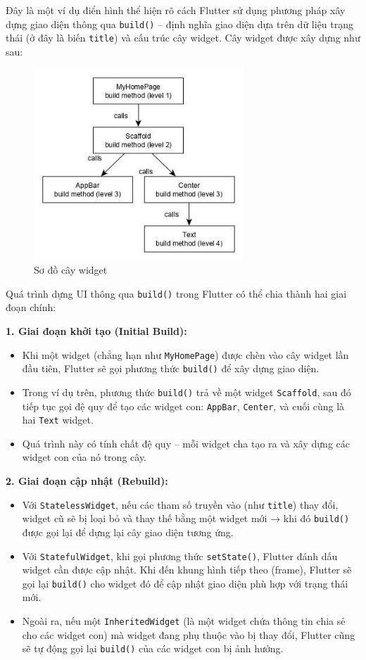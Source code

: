 \documentclass[../DoAn.tex]{subfiles}
\numberwithin{figure}{chapter}
\begin{document}
Đây là một ví dụ điển hình thể hiện rõ cách Flutter sử dụng phương pháp xây dựng giao diện thông qua \texttt{build()} – định nghĩa giao diện dựa trên dữ liệu trạng thái (ở đây là biến \texttt{title}) và cấu trúc cây widget. Cây widget được xây dựng như sau:
\begin{figure}[H]
    \centering
    \includegraphics[width=0.7\textwidth]{Hinhve/Chuong5/widgettree.png}
    \caption{Sơ đồ cây widget}
    \label{fig:widgettree}
\end{figure}
Quá trình dựng UI thông qua \texttt{build()} trong Flutter có thể chia thành hai giai đoạn chính:

\textbf{1. Giai đoạn khởi tạo (Initial Build):}
\begin{itemize}
\item Khi một widget (chẳng hạn như \texttt{MyHomePage}) được chèn vào cây widget lần đầu tiên, Flutter sẽ gọi phương thức \texttt{build()} để xây dựng giao diện.
\item Trong ví dụ trên, phương thức \texttt{build()} trả về một widget \texttt{Scaffold}, sau đó tiếp tục gọi đệ quy để tạo các widget con: \texttt{AppBar}, \texttt{Center}, và cuối cùng là hai \texttt{Text} widget.
\item Quá trình này có tính chất đệ quy – mỗi widget cha tạo ra và xây dựng các widget con của nó trong cây.
\end{itemize}

\textbf{2. Giai đoạn cập nhật (Rebuild):}
\begin{itemize}
\item Với \texttt{StatelessWidget}, nếu các tham số truyền vào (như \texttt{title}) thay đổi, widget cũ sẽ bị loại bỏ và thay thế bằng một widget mới → khi đó \texttt{build()} được gọi lại để dựng lại cây giao diện tương ứng.
\item Với \texttt{StatefulWidget}, khi gọi phương thức \texttt{setState()}, Flutter đánh dấu widget cần được cập nhật. Khi đến khung hình tiếp theo (frame), Flutter sẽ gọi lại \texttt{build()} cho widget đó để cập nhật giao diện phù hợp với trạng thái mới.
\item Ngoài ra, nếu một \texttt{InheritedWidget} (là một widget chứa thông tin chia sẻ cho các widget con) mà widget đang phụ thuộc vào bị thay đổi, Flutter cũng sẽ tự động gọi lại \texttt{build()} của các widget con bị ảnh hưởng.
\end{itemize}
\end{document}
